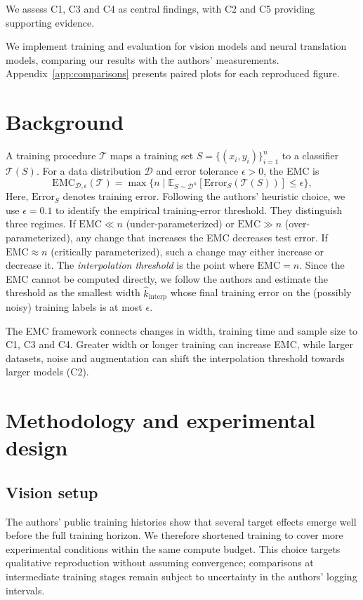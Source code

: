 \documentclass{article}
\begin{document}
We assess C1, C3 and C4 as central findings, with C2 and C5 providing supporting evidence.

We implement training and evaluation for vision models and neural translation models, comparing our results with the authors' measurements. Appendix~\ref{app:comparisons} presents paired plots for each reproduced figure.

\section{Background}\label{sec:background}
A training procedure $\mathcal{T}$ maps a training set
$S=\{(x_i,y_i)\}_{i=1}^{n}$ to a classifier $\mathcal{T}(S)$. For a data distribution $\mathcal{D}$ and error tolerance
$\epsilon>0$, the EMC is
\begin{equation}
  \mathrm{EMC}_{\mathcal{D},\epsilon}(\mathcal{T})
  = \max\bigl\{n \mid \mathbb{E}_{S\sim\mathcal{D}^n}
    [\mathrm{Error}_S(\mathcal{T}(S))] \le \epsilon\bigr\},
  \label{eq:emc}
\end{equation}
Here, $\mathrm{Error}_S$ denotes training error. Following the authors' heuristic choice, we use $\epsilon=0.1$ to identify the empirical training-error threshold. They distinguish three regimes. If $\mathrm{EMC}\ll n$ (under-parameterized) or $\mathrm{EMC}\gg n$ (over-parameterized), any change that increases the EMC decreases test error. If $\mathrm{EMC}\approx n$ (critically parameterized), such a change may either increase or decrease it. The \emph{interpolation threshold} is the point where $\mathrm{EMC}=n$. Since the EMC cannot be computed directly, we follow the authors and estimate the threshold as the smallest width $\hat{k}_{\mathrm{interp}}$ whose final training error on the (possibly noisy) training labels is at most $\epsilon$.

The EMC framework connects changes in width, training time and sample size to C1, C3 and C4. Greater width or longer training can increase EMC, while larger datasets, noise and augmentation can shift the interpolation threshold towards larger models (C2).


\section{Methodology and experimental design}
\subsection{Vision setup}\label{sec:vision-setup}
The authors' public training histories show that several target effects emerge well before the full training horizon. We therefore shortened training to cover more experimental conditions within the same compute budget. This choice targets qualitative reproduction without assuming convergence; comparisons at intermediate training stages remain subject to uncertainty in the authors' logging intervals.
\end{document}

